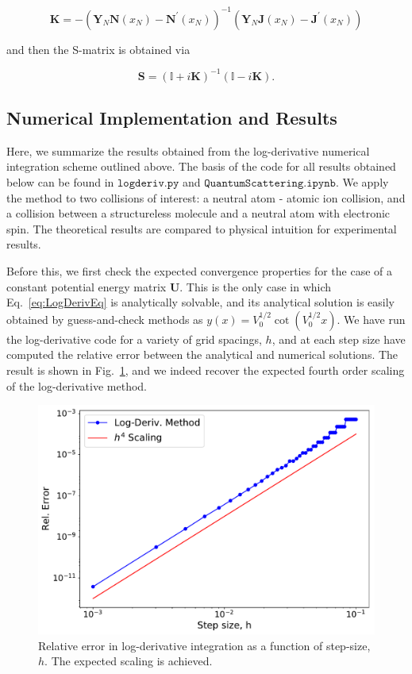 \documentclass[%
 reprint,
 amsmath,amssymb,
 aps,
 nofootinbib
]{revtex4-1}
\begin{document}
\begin{equation}
\mathbf{K} = -\left(\mathbf{Y}_N \mathbf{N}(x_N) - \mathbf{N}^\prime(x_N)\right)^{-1}  \left(\mathbf{Y}_N \mathbf{J}(x_N) - \mathbf{J}^\prime(x_N)\right)
\end{equation}

\noindent and then the S-matrix is obtained via 

\begin{equation}
\mathbf{S} = \left(\mathbb{I} + i \mathbf{K}\right)^{-1} \left( \mathbb{I} - i \mathbf{K} \right).
\end{equation}

\subsection{Numerical Implementation and Results}
Here, we summarize the results obtained from the log-derivative numerical integration scheme outlined above. The basis of the code for all results obtained below can be found in $\texttt{logderiv.py}$ and $\texttt{QuantumScattering.ipynb}$. We apply the method to two collisions of interest: a neutral atom - atomic ion collision, and a collision between a structureless molecule and a neutral atom with electronic spin. The theoretical results are compared to physical intuition for experimental results. 

Before this, we first check the expected convergence properties for the case of a constant potential energy matrix $\mathbf{U}$. This is the only case in which Eq.~\ref{eq:LogDerivEq} is analytically solvable, and its analytical solution is easily obtained by guess-and-check methods as $y(x) = V_0^{1/2} \cot(V_0^{1/2} x)$. We have run the log-derivative code for a variety of grid spacings, $h$, and at each step size have computed the relative error between the analytical and numerical solutions. The result is shown in Fig.~\ref{fig:ConvCheck}, and we indeed recover the expected fourth order scaling of the log-derivative method. 

\begin{figure}[b]
\includegraphics[width=1\columnwidth]{./Results/LogDerivErrorScaling}
\caption{Relative error in log-derivative integration as a function of step-size, $h$. The expected scaling is achieved.}
\label{fig:ConvCheck}
\end{figure}
\end{document}
